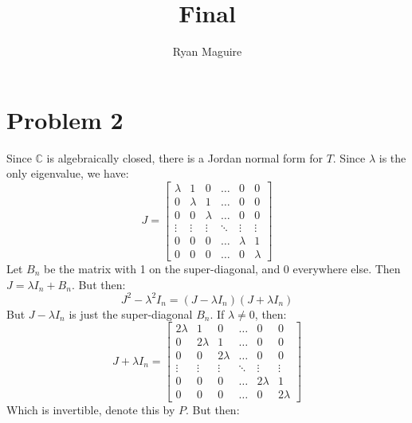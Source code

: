 \documentclass[crop=false,class=article]{standalone}                           %
\begin{document}
    \title{Final}
    \author{Ryan Maguire}
    \date{\vspace{-5ex}}
    \maketitle
    \section*{Problem 2}
        \setcounter{section}{2}
        Since $\mathbb{C}$ is algebraically closed, there is a Jordan normal
        form for $T$. Since $\lambda$ is the only eigenvalue, we have:
        \begin{equation}
            J=
            \begin{bmatrix}
                \lambda&1&0&\dots&0&0\\
                0&\lambda&1&\dots&0&0\\
                0&0&\lambda&\dots&0&0\\
                \vdots&\vdots&\vdots&\ddots&\vdots&\vdots\\
                0&0&0&\dots&\lambda&1\\
                0&0&0&\dots&0&\lambda
            \end{bmatrix}
        \end{equation}
        Let $B_{n}$ be the matrix with 1 on the super-diagonal, and 0 everywhere
        else. Then $J=\lambda{I}_{n}+B_{n}$. But then:
        \begin{equation}
            J^{2}-\lambda^{2}I_{n}=(J-\lambda{I}_{n})(J+\lambda{I}_{n})
        \end{equation}
        But $J-\lambda{I}_{n}$ is just the super-diagonal $B_{n}$. If
        $\lambda\ne{0}$, then:
        \begin{equation}
            J+\lambda{I}_{n}=
            \begin{bmatrix}
                2\lambda&1&0&\dots&0&0\\
                0&2\lambda&1&\dots&0&0\\
                0&0&2\lambda&\dots&0&0\\
                \vdots&\vdots&\vdots&\ddots&\vdots&\vdots\\
                0&0&0&\dots&2\lambda&1\\
                0&0&0&\dots&0&2\lambda
            \end{bmatrix}
        \end{equation}
        Which is invertible, denote this by $P$. But then:
\end{document}
